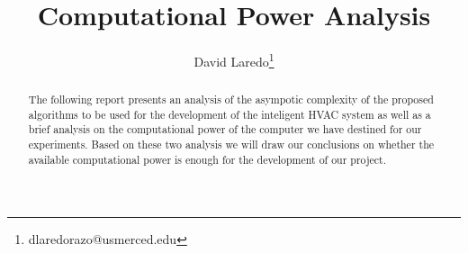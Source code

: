 \documentclass{article}
\title{Computational Power Analysis}
\author[1]{David Laredo\thanks{dlaredorazo@usmerced.edu}}
\date{}
\begin{document}
\maketitle %

\thispagestyle{fancy} %


\glsunsetall


\begin{abstract}

\noindent 

The following report presents an analysis of the asympotic complexity of the proposed algorithms to be used for the development of the inteligent HVAC system as well as a brief analysis on the computational power of the computer we have destined for our experiments. Based on these two analysis we will draw our conclusions on whether the available computational power is enough for the development of our project.

\end{abstract}












\end{document}
